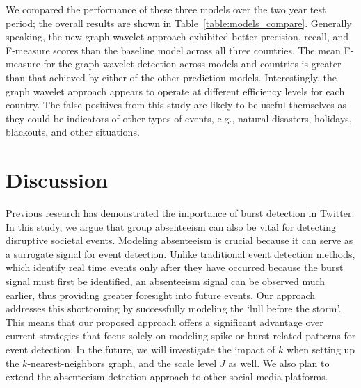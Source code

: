 We compared the performance of these three models over the two year test period; the overall results are shown in Table~\ref{table:models_compare}. Generally speaking, the new graph wavelet approach exhibited better precision, recall, and F-measure scores than the baseline model across all three countries. The mean F-measure for the graph wavelet detection across models and countries is greater than that achieved by either of the other prediction models. Interestingly, the graph wavelet approach appears to operate at different efficiency levels for each country. The false positives from this study are likely to be useful
themselves as they could be indicators of other types of events, e.g.,
natural disasters, holidays, blackouts, and other situations.



\section{Discussion} \label{sec:conclusion}
Previous research has demonstrated the importance of burst detection in Twitter. In this study, we argue that group absenteeism can also be vital for detecting disruptive societal events. Modeling absenteeism is crucial because it can serve as a surrogate signal for event detection. %
Unlike traditional event detection methods, which identify real time events only after they have occurred because the burst signal must first be identified, an absenteeism signal can be observed much earlier, thus providing greater foresight into future events.
Our approach addresses this shortcoming by successfully modeling the `lull before the storm'.
This means that our proposed approach offers a significant advantage over current strategies that focus solely on modeling spike or burst related patterns for event detection. In the future, we will investigate the impact of $k$ when setting up the $k$-nearest-neighbors graph, and the scale level $J$ as well. We also plan to extend the absenteeism detection approach to other social media platforms.

